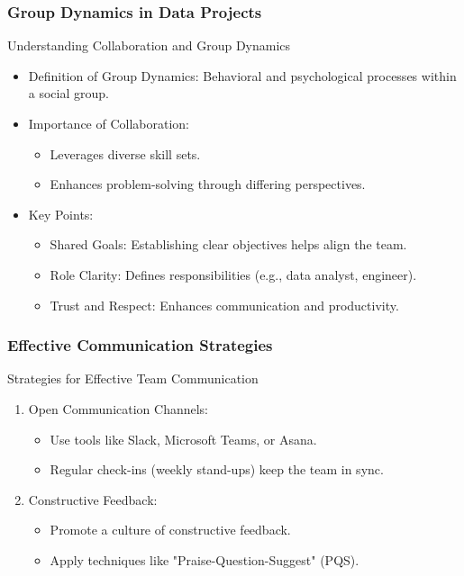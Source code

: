 \documentclass[aspectratio=169]{beamer}
\begin{document}
\begin{frame}[fragile]
    \frametitle{Group Dynamics in Data Projects}
    \begin{block}{Understanding Collaboration and Group Dynamics}
        \begin{itemize}
            \item Definition of Group Dynamics: Behavioral and psychological processes within a social group.
            \item Importance of Collaboration:
            \begin{itemize}
                \item Leverages diverse skill sets.
                \item Enhances problem-solving through differing perspectives.
            \end{itemize}
            \item Key Points:
            \begin{itemize}
                \item Shared Goals: Establishing clear objectives helps align the team.
                \item Role Clarity: Defines responsibilities (e.g., data analyst, engineer).
                \item Trust and Respect: Enhances communication and productivity.
            \end{itemize}
        \end{itemize}
    \end{block}
\end{frame}

\begin{frame}[fragile]
    \frametitle{Effective Communication Strategies}
    \begin{block}{Strategies for Effective Team Communication}
        \begin{enumerate}
            \item Open Communication Channels:
            \begin{itemize}
                \item Use tools like Slack, Microsoft Teams, or Asana.
                \item Regular check-ins (weekly stand-ups) keep the team in sync.
            \end{itemize}
            \item Constructive Feedback:
            \begin{itemize}
                \item Promote a culture of constructive feedback.
                \item Apply techniques like "Praise-Question-Suggest" (PQS).
            \end{itemize}
        \end{enumerate}
    \end{block}
\end{frame}
\end{document}
